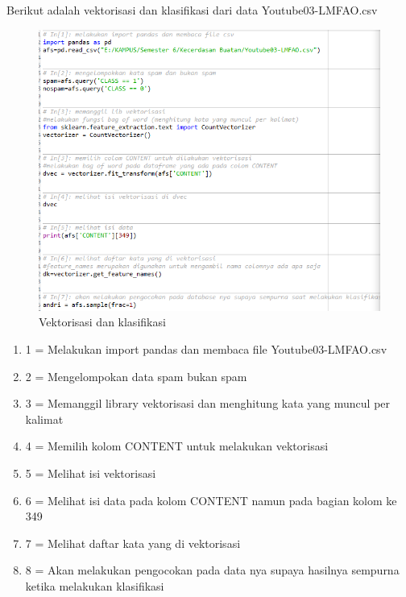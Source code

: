 \begin{enumerate}
	\par Berikut adalah vektorisasi dan klasifikasi dari data Youtube03-LMFAO.csv
		\begin{figure}[ht]
		\centering
		\includegraphics[scale=0.5]{figures/AFS/a5.png}
		\caption{Vektorisasi dan klasifikasi}
		\label{contoh}
		\end{figure}
	\begin{enumerate}
	\item 1 = Melakukan import pandas dan membaca file Youtube03-LMFAO.csv
	\item 2 = Mengelompokan data spam bukan spam
	\item 3 = Memanggil library vektorisasi dan menghitung kata yang muncul per kalimat
	\item 4 = Memilih kolom CONTENT untuk melakukan vektorisasi
	\item 5 = Melihat isi vektorisasi
	\item 6 = Melihat isi data pada kolom CONTENT namun pada bagian kolom ke 349
	\item 7 = Melihat daftar kata yang di vektorisasi
	\item 8 = Akan melakukan pengocokan pada data nya supaya hasilnya sempurna ketika melakukan klasifikasi
	\end{enumerate}
	

\end{enumerate}
